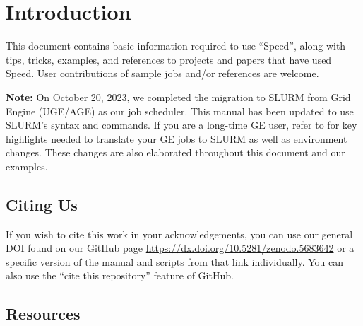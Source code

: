 \section{Introduction}
\label{sect:introduction}

This document contains basic information required to use ``Speed'', along with tips,
tricks, examples, and references to projects and papers that have used Speed.
User contributions of sample jobs and/or references are welcome.

\noindent \textbf{Note:}
On October 20, 2023, we completed the migration to SLURM from Grid Engine (UGE/AGE) as our job scheduler.
This manual has been updated to use SLURM's syntax and commands.
If you are a long-time GE user, refer to  for key highlights needed to
translate your GE jobs to SLURM as well as environment changes.
These changes are also elaborated throughout this document and our examples.

\subsection{Citing Us}
\label{sect:citing-speed-hpc}

If you wish to cite this work in your acknowledgements, you can use our general DOI found on our GitHub page
\url{https://dx.doi.org/10.5281/zenodo.5683642} or a specific version of the manual and scripts from that link individually.
You can also use the ``cite this repository'' feature of GitHub.

\subsection{Resources}
\label{sect:resources}

